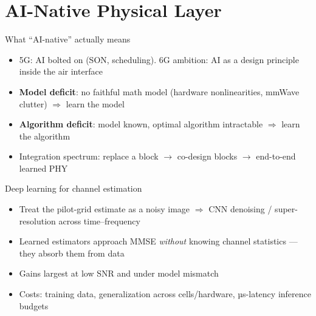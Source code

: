 \section{AI-Native Physical Layer}

\begin{frame}{What ``AI-native'' actually means}
  \begin{itemize}\itemsep2pt
    \item 5G: AI bolted on (SON, scheduling). 6G ambition: AI as a
          \alert{design principle} inside the air interface
    \item \textbf{Model deficit}: no faithful math model (hardware
          nonlinearities, mmWave clutter) $\Rightarrow$ learn the model
    \item \textbf{Algorithm deficit}: model known, optimal algorithm
          intractable $\Rightarrow$ learn the algorithm
    \item Integration spectrum: replace a block $\to$ co-design blocks $\to$
          end-to-end learned PHY
  \end{itemize}
\end{frame}

\begin{frame}{Deep learning for channel estimation}
  \begin{itemize}\itemsep2pt
    \item Treat the pilot-grid estimate as a \alert{noisy image} $\Rightarrow$
          CNN denoising / super-resolution across time--frequency
    \item Learned estimators approach MMSE \emph{without} knowing channel
          statistics --- they absorb them from data
    \item Gains largest at low SNR and under model mismatch
    \item Costs: training data, generalization across cells/hardware,
          µs-latency inference budgets
  \end{itemize}
\end{frame}

